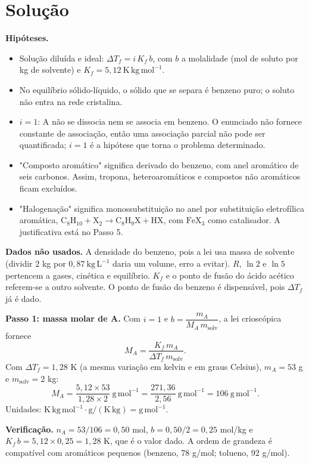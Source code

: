 \documentclass{article}%
\begin{document}
\section*{Solução}

\textbf{Hipóteses.}
\begin{itemize}
\item[H1] Solução diluída e ideal: $\Delta T_f=i\,K_f\,b$, com $b$ a molalidade (mol de soluto por kg de solvente) e $K_f=5{,}12\ \mathrm{K\,kg\,mol^{-1}}$.
\item[H2] No equilíbrio sólido-líquido, o sólido que se separa é benzeno puro; o soluto não entra na rede cristalina.
\item[H3] $i=1$: A não se dissocia nem se associa em benzeno. O enunciado não fornece constante de associação, então uma associação parcial não pode ser quantificada; $i=1$ é a hipótese que torna o problema determinado.
\item[H4] "Composto aromático" significa derivado do benzeno, com anel aromático de seis carbonos. Assim, tropona, heteroaromáticos e compostos não aromáticos ficam excluídos.
\item[H5] "Halogenação" significa monossubstituição no anel por substituição eletrofílica aromática, $\mathrm{C_8H_{10}+X_2\rightarrow C_8H_9X+HX}$, com $\mathrm{FeX_3}$ como catalisador. A justificativa está no Passo 5.
\end{itemize}

\textbf{Dados não usados.} A densidade do benzeno, pois a lei usa massa de solvente (dividir $2$ kg por $0{,}87\ \mathrm{kg\,L^{-1}}$ daria um volume, erro a evitar). $R$, $\ln 2$ e $\ln 5$ pertencem a gases, cinética e equilíbrio. $K_f$ e o ponto de fusão do ácido acético referem-se a outro solvente. O ponto de fusão do benzeno é dispensável, pois $\Delta T_f$ já é dado.

\textbf{Passo 1: massa molar de A.} Com $i=1$ e $b=\dfrac{m_A}{M_A\,m_{\mathrm{solv}}}$, a lei crioscópica fornece
\[
M_A=\frac{K_f\,m_A}{\Delta T_f\,m_{\mathrm{solv}}}.
\]
Com $\Delta T_f=1{,}28$ K (a mesma variação em kelvin e em graus Celsius), $m_A=53$ g e $m_{\mathrm{solv}}=2$ kg:
\[
M_A=\frac{5{,}12\times 53}{1{,}28\times 2}\ \mathrm{g\,mol^{-1}}=\frac{271{,}36}{2{,}56}\ \mathrm{g\,mol^{-1}}=106\ \mathrm{g\,mol^{-1}}.
\]
Unidades: $\mathrm{K\,kg\,mol^{-1}}\cdot\mathrm{g}/(\mathrm{K\,kg})=\mathrm{g\,mol^{-1}}$.

\textbf{Verificação.} $n_A=53/106=0{,}50$ mol, $b=0{,}50/2=0{,}25$ mol/kg e $K_f\,b=5{,}12\times 0{,}25=1{,}28$ K, que é o valor dado. A ordem de grandeza é compatível com aromáticos pequenos (benzeno, 78 g/mol; tolueno, 92 g/mol).
\end{document}
